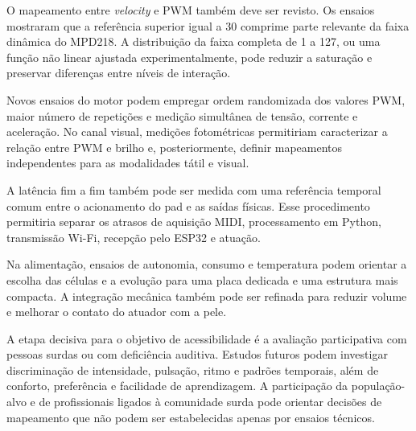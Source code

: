 O mapeamento entre \textit{velocity} e PWM também deve ser revisto. Os ensaios mostraram que a referência superior igual a 30 comprime parte relevante da faixa dinâmica do MPD218. A distribuição da faixa completa de 1 a 127, ou uma função não linear ajustada experimentalmente, pode reduzir a saturação e preservar diferenças entre níveis de interação.

Novos ensaios do motor podem empregar ordem randomizada dos valores PWM, maior número de repetições e medição simultânea de tensão, corrente e aceleração. No canal visual, medições fotométricas permitiriam caracterizar a relação entre PWM e brilho e, posteriormente, definir mapeamentos independentes para as modalidades tátil e visual.

A latência fim a fim também pode ser medida com uma referência temporal comum entre o acionamento do pad e as saídas físicas. Esse procedimento permitiria separar os atrasos de aquisição MIDI, processamento em Python, transmissão Wi-Fi, recepção pelo ESP32 e atuação.

Na alimentação, ensaios de autonomia, consumo e temperatura podem orientar a escolha das células e a evolução para uma placa dedicada e uma estrutura mais compacta. A integração mecânica também pode ser refinada para reduzir volume e melhorar o contato do atuador com a pele.

A etapa decisiva para o objetivo de acessibilidade é a avaliação participativa com pessoas surdas ou com deficiência auditiva. Estudos futuros podem investigar discriminação de intensidade, pulsação, ritmo e padrões temporais, além de conforto, preferência e facilidade de aprendizagem. A participação da população-alvo e de profissionais ligados à comunidade surda pode orientar decisões de mapeamento que não podem ser estabelecidas apenas por ensaios técnicos.

